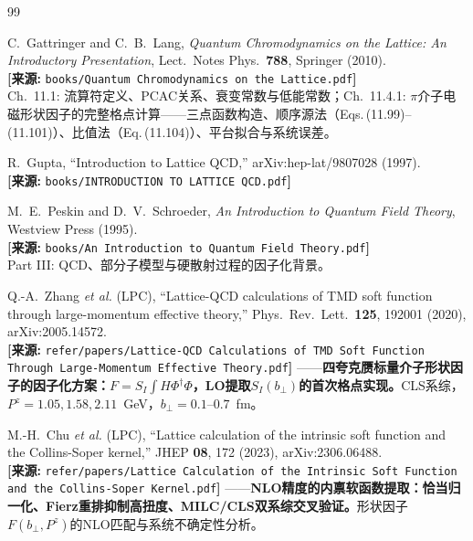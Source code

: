 \documentclass[12pt,a4paper]{ctexart}
\theoremstyle{definition}
\begin{document}
\begin{thebibliography}{99}

C.~Gattringer and C.~B.~Lang,
\textit{Quantum Chromodynamics on the Lattice: An Introductory Presentation},
Lect.\ Notes Phys.\ \textbf{788}, Springer (2010).
\\\textbf{[来源:} \texttt{books/Quantum Chromodynamics on the Lattice.pdf}\textbf{]}
\\Ch.~11.1: 流算符定义、PCAC关系、衰变常数与低能常数；Ch.~11.4.1: $\pi$介子电磁形状因子的完整格点计算——三点函数构造、顺序源法（Eqs.\,(11.99)--(11.101)）、比值法（Eq.\,(11.104)）、平台拟合与系统误差。

R.~Gupta,
``Introduction to Lattice QCD,''
arXiv:hep-lat/9807028 (1997).
\\\textbf{[来源:} \texttt{books/INTRODUCTION TO LATTICE QCD.pdf}\textbf{]}

M.~E.~Peskin and D.~V.~Schroeder,
\textit{An Introduction to Quantum Field Theory},
Westview Press (1995).
\\\textbf{[来源:} \texttt{books/An Introduction to Quantum Field Theory.pdf}\textbf{]}
\\Part III: QCD、部分子模型与硬散射过程的因子化背景。

Q.-A.~Zhang \textit{et al.} (LPC),
``Lattice-QCD calculations of TMD soft function through large-momentum effective theory,''
Phys.\ Rev.\ Lett.\ \textbf{125}, 192001 (2020), arXiv:2005.14572.
\\\textbf{[来源:} \texttt{refer/papers/Lattice-QCD Calculations of TMD Soft Function Through Large-Momentum Effective Theory.pdf}\textbf{]}
——\textbf{四夸克赝标量介子形状因子的因子化方案：$F = S_I \int H \Phi^\dagger \Phi$，LO提取$S_I(b_\perp)$的首次格点实现。}CLS系综，$P^z = 1.05, 1.58, 2.11$~GeV，$b_\perp = 0.1\text{--}0.7$~fm。

M.-H.~Chu \textit{et al.} (LPC),
``Lattice calculation of the intrinsic soft function and the Collins-Soper kernel,''
JHEP \textbf{08}, 172 (2023), arXiv:2306.06488.
\\\textbf{[来源:} \texttt{refer/papers/Lattice Calculation of the Intrinsic Soft Function and the Collins-Soper Kernel.pdf}\textbf{]}
——\textbf{NLO精度的内禀软函数提取：恰当归一化、Fierz重排抑制高扭度、MILC/CLS双系综交叉验证。}形状因子$F(b_\perp, P^z)$的NLO匹配与系统不确定性分析。


\end{thebibliography}
\end{document}
